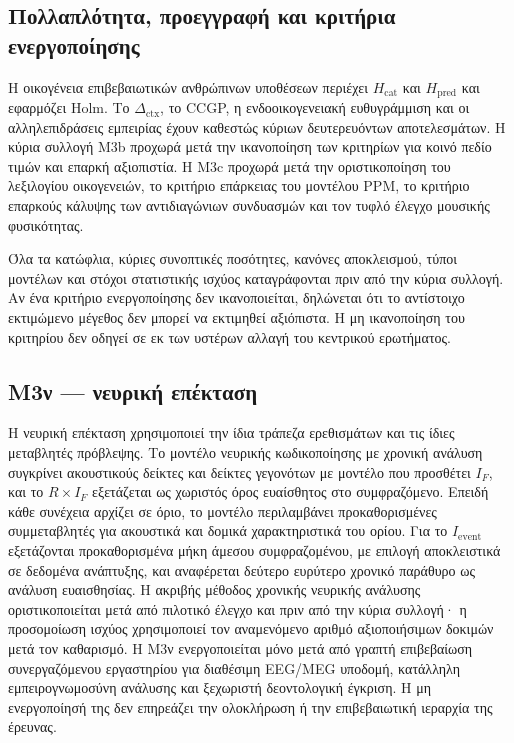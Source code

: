 \documentclass[11pt,a4paper]{article}
\begin{document}
\subsection{Πολλαπλότητα, προεγγραφή και κριτήρια ενεργοποίησης}\label{app:human-gates}

Η οικογένεια επιβεβαιωτικών ανθρώπινων υποθέσεων περιέχει $H_{\mathrm{cat}}$ και $H_{\mathrm{pred}}$ και εφαρμόζει Holm. Το $\Delta_{\mathrm{ctx}}$, το CCGP, η ενδοοικογενειακή ευθυγράμμιση και οι αλληλεπιδράσεις εμπειρίας έχουν καθεστώς κύριων δευτερευόντων αποτελεσμάτων. Η κύρια συλλογή M3b προχωρά μετά την ικανοποίηση των κριτηρίων για κοινό πεδίο τιμών και επαρκή αξιοπιστία. Η M3c προχωρά μετά την οριστικοποίηση του λεξιλογίου οικογενειών, το κριτήριο επάρκειας του μοντέλου PPM, το κριτήριο επαρκούς κάλυψης των αντιδιαγώνιων συνδυασμών και τον τυφλό έλεγχο μουσικής φυσικότητας.

Όλα τα κατώφλια, κύριες συνοπτικές ποσότητες, κανόνες αποκλεισμού, τύποι μοντέλων και στόχοι στατιστικής ισχύος καταγράφονται πριν από την κύρια συλλογή. Αν ένα κριτήριο ενεργοποίησης δεν ικανοποιείται, δηλώνεται ότι το αντίστοιχο εκτιμώμενο μέγεθος δεν μπορεί να εκτιμηθεί αξιόπιστα. Η μη ικανοποίηση του κριτηρίου δεν οδηγεί σε εκ των υστέρων αλλαγή του κεντρικού ερωτήματος.

\subsection{M3ν — νευρική επέκταση}\label{app:human-neural}

Η νευρική επέκταση χρησιμοποιεί την ίδια τράπεζα ερεθισμάτων και τις ίδιες μεταβλητές πρόβλεψης. Το μοντέλο νευρικής κωδικοποίησης με χρονική ανάλυση συγκρίνει ακουστικούς δείκτες και δείκτες γεγονότων με μοντέλο που προσθέτει $I_F$, και το $R\times I_F$ εξετάζεται ως χωριστός όρος ευαίσθητος στο συμφραζόμενο. Επειδή κάθε συνέχεια αρχίζει σε όριο, το μοντέλο περιλαμβάνει προκαθορισμένες συμμεταβλητές για ακουστικά και δομικά χαρακτηριστικά του ορίου. Για το $I_{\mathrm{event}}$ εξετάζονται προκαθορισμένα μήκη άμεσου συμφραζομένου, με επιλογή αποκλειστικά σε δεδομένα ανάπτυξης, και αναφέρεται δεύτερο ευρύτερο χρονικό παράθυρο ως ανάλυση ευαισθησίας. Η ακριβής μέθοδος χρονικής νευρικής ανάλυσης οριστικοποιείται μετά από πιλοτικό έλεγχο και πριν από την κύρια συλλογή· η προσομοίωση ισχύος χρησιμοποιεί τον αναμενόμενο αριθμό αξιοποιήσιμων δοκιμών μετά τον καθαρισμό. Η M3ν ενεργοποιείται μόνο μετά από γραπτή επιβεβαίωση συνεργαζόμενου εργαστηρίου για διαθέσιμη EEG/MEG υποδομή, κατάλληλη εμπειρογνωμοσύνη ανάλυσης και ξεχωριστή δεοντολογική έγκριση. Η μη ενεργοποίησή της δεν επηρεάζει την ολοκλήρωση ή την επιβεβαιωτική ιεραρχία της έρευνας.
\end{document}
